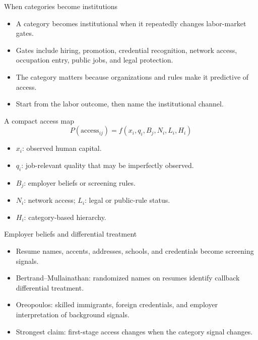 \documentclass[aspectratio=169,11pt]{beamer}
\begin{document}
\begin{frame}{When categories become institutions}
\begin{itemize}
    \item A category becomes institutional when it repeatedly changes labor-market gates.
    \item Gates include hiring, promotion, credential recognition, network access, occupation entry, public jobs, and legal protection.
    \item The category matters because organizations and rules make it predictive of access.
    \item Start from the labor outcome, then name the institutional channel.
\end{itemize}
\end{frame}

\begin{frame}{A compact access map}
\[
P(\text{access}_{ij}) = f(x_i, q_i, B_j, N_i, L_i, H_i)
\]
\begin{itemize}
    \item $x_i$: observed human capital.
    \item $q_i$: job-relevant quality that may be imperfectly observed.
    \item $B_j$: employer beliefs or screening rules.
    \item $N_i$: network access; $L_i$: legal or public-rule status.
    \item $H_i$: category-based hierarchy.
\end{itemize}
\end{frame}

\begin{frame}{Employer beliefs and differential treatment}
\begin{itemize}
    \item Resume names, accents, addresses, schools, and credentials become screening signals.
    \item Bertrand--Mullainathan: randomized names on resumes identify callback differential treatment.
    \item Oreopoulos: skilled immigrants, foreign credentials, and employer interpretation of background signals.
    \item Strongest claim: first-stage access changes when the category signal changes.
\end{itemize}
\end{frame}
\end{document}
